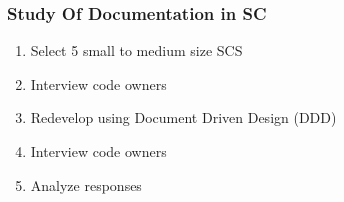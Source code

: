 \documentclass[t,12pt,numbers,fleqn]{beamer}
\begin{document}

\begin{frame}

\frametitle{Study Of Documentation in SC \cite{SmithJegatheesanAndKelly2016}}

\begin{enumerate}

\item Select 5 small to medium size SCS
\item Interview code owners
\item Redevelop using Document Driven Design (DDD)
\item Interview code owners
\item Analyze responses

\end{enumerate}

\end{frame}


\end{document}
